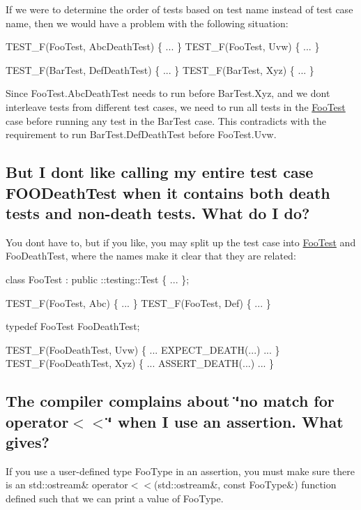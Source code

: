 If we were to determine the order of tests based on test name instead of test case name, then we would have a problem with the following situation\+:


\begin{DoxyCode}
TEST\_F(FooTest, AbcDeathTest) \{ ... \}
TEST\_F(FooTest, Uvw) \{ ... \}

TEST\_F(BarTest, DefDeathTest) \{ ... \}
TEST\_F(BarTest, Xyz) \{ ... \}
\end{DoxyCode}


Since {\ttfamily Foo\+Test.\+Abc\+Death\+Test} needs to run before {\ttfamily Bar\+Test.\+Xyz}, and we don\textquotesingle{}t interleave tests from different test cases, we need to run all tests in the {\ttfamily \hyperlink{class_foo_test}{Foo\+Test}} case before running any test in the {\ttfamily Bar\+Test} case. This contradicts with the requirement to run {\ttfamily Bar\+Test.\+Def\+Death\+Test} before {\ttfamily Foo\+Test.\+Uvw}.

\subsection*{But I don\textquotesingle{}t like calling my entire test case F\+O\+O\+Death\+Test when it contains both death tests and non-\/death tests. What do I do?}

You don\textquotesingle{}t have to, but if you like, you may split up the test case into {\ttfamily \hyperlink{class_foo_test}{Foo\+Test}} and {\ttfamily Foo\+Death\+Test}, where the names make it clear that they are related\+:


\begin{DoxyCode}
class FooTest : public ::testing::Test \{ ... \};

TEST\_F(FooTest, Abc) \{ ... \}
TEST\_F(FooTest, Def) \{ ... \}

typedef FooTest FooDeathTest;

TEST\_F(FooDeathTest, Uvw) \{ ... EXPECT\_DEATH(...) ... \}
TEST\_F(FooDeathTest, Xyz) \{ ... ASSERT\_DEATH(...) ... \}
\end{DoxyCode}


\subsection*{The compiler complains about \char`\"{}no match for \textquotesingle{}operator$<$$<$\textquotesingle{}\char`\"{} when I use an assertion. What gives?}

If you use a user-\/defined type {\ttfamily Foo\+Type} in an assertion, you must make sure there is an {\ttfamily std\+::ostream\& operator$<$$<$(std\+::ostream\&, const Foo\+Type\&)} function defined such that we can print a value of {\ttfamily Foo\+Type}.

